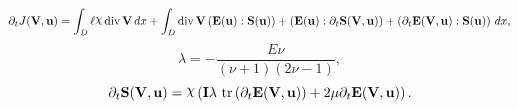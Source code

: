 \documentclass[preview]{standalone}
\begin{document}
\begin{dmath*}
\partial_{t} J({\mathbf V},{\mathbf{ u }}) =  \int_{D} \ell \raisebox{\depth}{$\chi$} \operatorname{div} {\mathbf V} \,dx +  \int_{D} \operatorname{div} {\mathbf V} \left( \mathbf E({\mathbf{ u }}) \mathrel{:} \mathbf S({\mathbf{ u }}) \right) + \left( \mathbf E({\mathbf{ u }}) \mathrel{:} \partial_{t} \mathbf S({\mathbf V},{\mathbf{ u }}) \right) + \left( \partial_{t} \mathbf E({\mathbf V},{\mathbf{ u }}) \mathrel{:} \mathbf S({\mathbf{ u }}) \right) \,dx,
 \end{dmath*}
\begin{dmath*}
\lambda = - \frac{E \nu}{\left(\nu + 1\right) \left(2 \nu - 1\right)},
 \end{dmath*}
\begin{dmath*}
\partial_{t} \mathbf S({\mathbf V},{\mathbf{ u }}) = \raisebox{\depth}{$\chi$} \left(\mathbf{I} \lambda  \,\operatorname{tr}\left(\partial_{t} \mathbf E({\mathbf V},{\mathbf{ u }})\right)  + 2 \mu \partial_{t} \mathbf E({\mathbf V},{\mathbf{ u }})\right).
 \end{dmath*}
\end{document}

